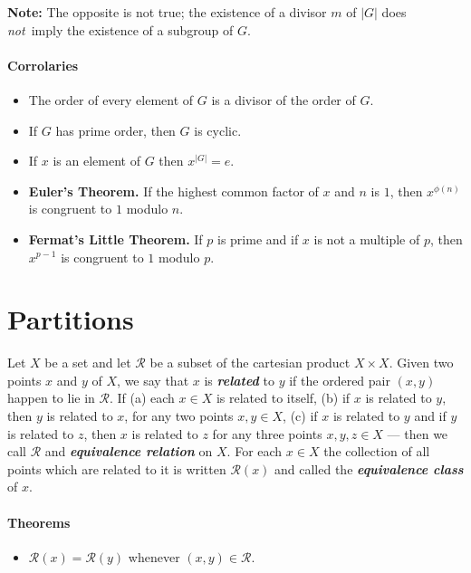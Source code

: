 \documentclass[a4paper,twocolumn,10pt]{article}
\begin{document}
  \textbf{Note:} The opposite is not true; the existence of a divisor $m$
  of $|G|$ does \textit{not} imply the existence of a subgroup of $G$.

  \paragraph{Corrolaries}
  \begin{itemize}[leftmargin=0.45in]
    \item[\theorem{11.2}] The order of every element of $G$ is a divisor of the
      order of $G$.

    \item[\theorem{11.3}] If $G$ has prime order, then $G$ is cyclic.

    \item[\theorem{11.4}] If $x$ is an element of $G$ then $x^{|G|}=e$.

    \item[\theorem{11.5}] \textbf{Euler's Theorem.} If the highest common
      factor of $x$ and $n$ is $1$, then $x^{\phi{(n)}}$ is congruent to $1$
      modulo $n$.

    \item[\theorem{11.6}] \textbf{Fermat's Little Theorem.} If $p$ is prime and
      if $x$ is not a multiple of $p$, then $x^{p-1}$ is congruent to $1$
      modulo $p$.
  \end{itemize}

  \section{Partitions}
  Let $X$ be a set and let $\mathscr{R}$ be a subset of the cartesian product
  $X\times X$. Given two points $x$ and $y$ of $X$, we say that $x$ is
  \textbf{\textit{related}} to $y$ if the ordered pair $(x,y)$ happen to lie in
  $\mathscr{R}$. If (a) each $x\in X$ is related to itself, (b) if $x$ is related
  to $y$, then $y$ is related to $x$, for any two points $x,y \in X$, (c) if
  $x$ is related to $y$ and if $y$ is related to $z$, then $x$ is related to
  $z$ for any three points $x,y,z \in X$ --- then we call $\mathscr{R}$ and
  \textbf{\textit{equivalence relation}} on $X$. For each $x\in X$ the
  collection of all points which are related to it is written $\mathscr{R}(x)$
  and called the \textbf{\textit{equivalence class}} of $x$.

  \paragraph{Theorems}
  \begin{itemize}[leftmargin=0.45in]
    \item[\theorem{12.1}] $\mathscr{R}(x) = \mathscr{R}(y)$ whenever $(x,y) \in
      \mathscr{R}$.
  \end{itemize}
\end{document}
